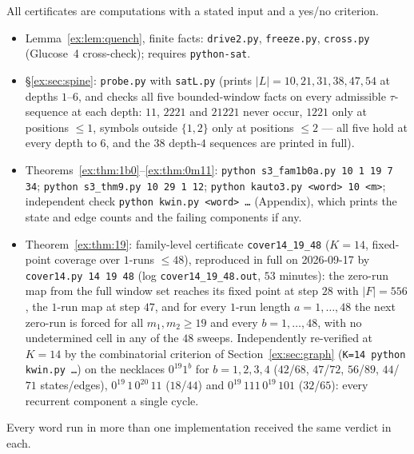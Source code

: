 \documentclass[11pt]{article}
\theoremstyle{definition}
\theoremstyle{remark}
\begin{document}
All certificates are computations with a stated input and a yes/no criterion.
\begin{itemize}[nosep]
\item Lemma~\ref{ex:lem:quench}, finite facts: \texttt{drive2.py}, \texttt{freeze.py}, \texttt{cross.py} (Glucose~4 cross-check); requires \texttt{python-sat}.
\item \S\ref{ex:sec:spine}: \texttt{probe.py} with \texttt{satL.py} (prints $|L|=10,21,31,38,47,54$ at depths $1$--$6$, and checks all five bounded-window facts on every admissible $\tau$-sequence at each depth: $11$, $2221$ and $21221$ never occur, $1221$ only at positions $\le1$, symbols outside $\{1,2\}$ only at positions $\le2$ --- all five hold at every depth to $6$, and the $38$ depth-$4$ sequences are printed in full).
\item Theorems~\ref{ex:thm:1b0}--\ref{ex:thm:0m11}: \texttt{python s3\_fam1b0a.py 10 1 19 7 34}; \texttt{python s3\_thm9.py 10 29 1 12}; \texttt{python kauto3.py <word> 10 <m>}; independent check \texttt{python kwin.py <word> \ldots} (Appendix), which prints the state and edge counts and the failing components if any.
\item Theorem~\ref{ex:thm:19}: family-level certificate \texttt{cover14\_19\_48} ($K=14$, fixed-point coverage over $1$-runs $\le48$), reproduced in full on 2026-09-17 by \texttt{cover14.py 14 19 48} (log \texttt{cover14\_19\_48.out}, $53$ minutes): the zero-run map from the full window set reaches its fixed point at step $28$ with $|F|=556$, the $1$-run map at step $47$, and for every $1$-run length $a=1,\dots,48$ the next zero-run is forced for all $m_1,m_2\ge19$ and every $b=1,\dots,48$, with no undetermined cell in any of the $48$ sweeps. Independently re-verified at $K=14$ by the combinatorial criterion of Section~\ref{ex:sec:graph} (\texttt{K=14 python kwin.py \ldots}) on the necklaces $0^{19}1^b$ for $b=1,2,3,4$ ($42$/$68$, $47$/$72$, $56$/$89$, $44$/$71$ states/edges), $0^{19}\,1\,0^{20}\,11$ ($18$/$44$) and $0^{19}\,111\,0^{19}\,101$ ($32$/$65$): every recurrent component a single cycle.
\end{itemize}
Every word run in more than one implementation received the same verdict in each.
\end{document}
